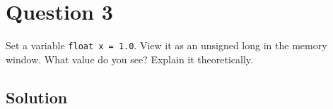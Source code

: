 \section*{Question 3}

Set a variable \verb|float x = 1.0|.
View it as an unsigned long in the memory window.
What value do you see?
Explain it theoretically.

\subsection*{Solution}
